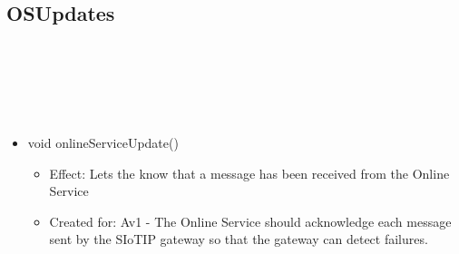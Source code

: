   \subsection{OSUpdates}\label{int:GatewayGatewayOnlineServiceBrokerOnlineServiceMonitorOSUpdates}
    \begin{description}
      \item[Provided by:] \iconcomponent{}~
      \item[Required by:] \iconcomponent{}~
      \item[Operations:] ~
    \begin{itemize}[noitemsep,nolistsep,leftmargin=-.25cm]
      \item \textsf{void onlineServiceUpdate()}
        \begin{itemize}[noitemsep,nolistsep]
           \item Effect: Lets the  know that a message has been received from the Online Service
\item Created for: Av1 - The Online Service should acknowledge each message sent by the SIoTIP gateway so that the gateway can detect failures.
        \end{itemize}
    \end{itemize}
    \end{description}


